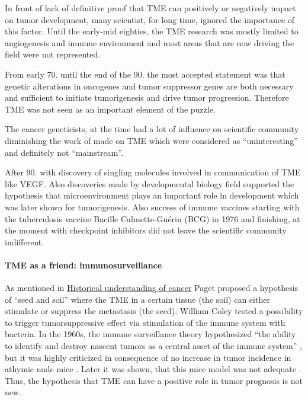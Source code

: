 \documentclass[12pt,]{book}
\let\oldparagraph\paragraph
\renewcommand{\paragraph}[1]{\oldparagraph{#1}\mbox{}}
\theoremstyle{definition}
\theoremstyle{definition}
\theoremstyle{definition}
\theoremstyle{remark}
\begin{document}
In front of lack of definitive proof that TME can positively or
negatively impact on tumor development, many scientist, for long time,
ignored the importance of this factor. Until the early-mid eighties, the
TME research was mostly limited to angiogenesis and immune environment
and most areas that are now driving the field were not represented.

From early 70. until the end of the 90. the most accepted statement was
that genetic alterations in oncogenes and tumor suppressor genes are
both necessary and sufficient to initiate tumorigenesis and drive tumor
progression. Therefore TME was not seen as an important element of the
puzzle.

The cancer geneticists, at the time had a lot of influence on scientific
community diminishing the work of made on TME which were considered as
``uninteresting'' and definitely not ``mainstream''.

After 90. with discovery of singling molecules involved in communication
of TME like VEGF. Also discoveries made by developmental biology field
supported the hypothesis that microenvironment plays an important role
in development which was later shown for tumorigenesis. Also success of
immune vaccines starting with the tuberculosis vaccine Bacille
Calmette-Guérin (BCG) in 1976 and finishing, at the moment with
checkpoint inhibitors did not leave the scientific community
indifferent.

\hypertarget{tme-as-a-friend-immunosurveillance}{%
\paragraph{TME as a friend:
immunosurveillance}\label{tme-as-a-friend-immunosurveillance}}

As mentioned in \protect\hyperlink{hist}{Historical understanding of
cancer} Paget proposed a hypothesis of ``seed and soil'' where the TME
in a certain tissue (the soil) can either stimulate or suppress the
metastasis (the seed). William Coley tested a possibility to trigger
tumorsuppressive effect via stimulation of the immune system with
bacteria. In the 1960s, the immune surveillance theory hypothesized
``the ability to identify and destroy nascent tumors as a central asset
of the immune system'' \citep{Sebeok1976, Burnet1970}, but it was highly
criticized in consequence of no increase in tumor incidence in athymic
nude mice \citep{Stutman1974, Rygaard1976}. Later it was shown, that
this mice model was not adequate \citep{Cavallo2011} . Thus, the
hypothesis that TME can have a positive role in tumor prognosis is not
new.
\end{document}
